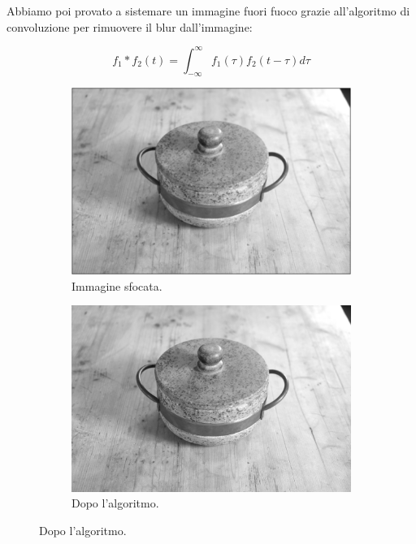 \documentclass[12pt]{report}
\begin{document}
Abbiamo poi provato a sistemare un immagine fuori fuoco grazie all'algoritmo di convoluzione per rimuovere il blur dall'immagine:


\begin{equation}
f_1 * f_2 (t)  =  \int_{-\infty}^{\infty}{f_1(\tau)f_2 (t - \tau)d\tau}
\end{equation}


\begin{figure}[H]
  \centering
  \begin{subfigure}[b]{0.35\linewidth}
    \centering
    \includegraphics[width=\linewidth]{img/pentola/blurred_deconv.png}
    \caption{Immagine sfocata.}
  \end{subfigure}
  \begin{subfigure}[b]{0.35\linewidth}
    \centering
    \includegraphics[width=\linewidth]{img/pentola/afuoco.jpg} %
    \caption{Dopo l'algoritmo.}
  \end{subfigure}
\end{figure}
\end{document}
